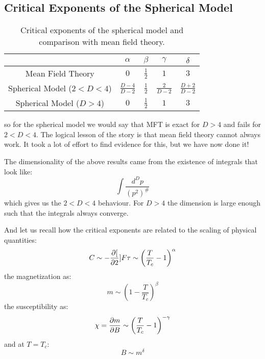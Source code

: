 \subsection{Critical Exponents of the Spherical Model}
\begin{table}[htbp]
    \centering\begin{tabular}{|c|c|c|c|c}
        & $\alpha$ & $\beta$ & $\gamma$ & $\delta$
        \\ \hline Mean Field Theory & $0$ & $\frac{1}{2}$ & $1$ & $3$
        \\ \hline Spherical Model ($2 < D < 4$) & $\frac{D - 4}{D - 2}$ & $\frac{1}{2}$ & $\frac{2}{D-2}$ & $\frac{D + 2}{D-2}$ 
        \\ \hline Spherical Model ($D > 4$)  & $0$ & $\frac{1}{2}$ & $1$ & $3$
    \end{tabular}
    \caption{Critical exponents of the spherical model and comparison with mean field theory.}
    \label{table-sphericalcriticalexponents}
\end{table}
so for the spherical model we would say that MFT is exact for $D > 4$ and fails for $2 < D < 4$. The logical lesson of the story is that mean field theory cannot always work. It took a lot of effort to find evidence for this, but we have now done it!

The dimensionality of the above results came from the existence of integrals that look like:
\begin{equation}
    \int \frac{d^D p}{(p^2)^{\#}}
\end{equation}
which gives us the $2 < D < 4$ behaviour. For $D > 4$ the dimension is large enough such that the integrals always converge.

And let us recall how the critical exponents are related to the scaling of physical quantities:
\begin{equation}
    C \sim -\frac{\partial [}{\partial 2}]{F}{\tau} \sim \left(\frac{T}{T_c} - 1\right)^\alpha
\end{equation}
the magnetization as:
\begin{equation}
    m \sim \left(1 - \frac{T}{T_c}\right)^\beta
\end{equation}
the susceptibility as:
\begin{equation}
    \chi = \frac{\partial m}{\partial B} \sim \left(\frac{T}{T_c} - 1\right)^{-\gamma}
\end{equation}
and at $T = T_c$:
\begin{equation}
    B \sim m^\delta
\end{equation}

